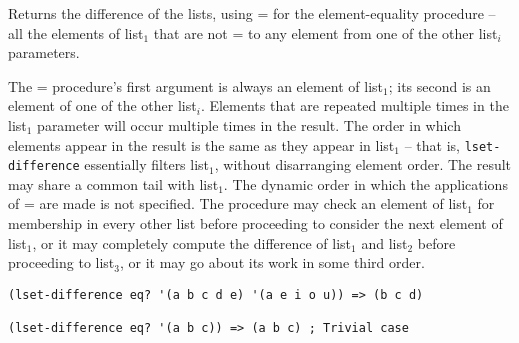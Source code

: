 \begin{entry}{%
  }

  Returns the difference of the lists, using =
  for the element-equality procedure -- all the elements of list$_1$
  that are not = to any element from one of the other list$_i$
  parameters.

  The = procedure's first argument is always an element of list$_1$;
  its second is an element of one of the other list$_i$. Elements that
  are repeated multiple times in the list$_1$ parameter will occur
  multiple times in the result.  The order in which elements appear in
  the result is the same as they appear in list$_1$ -- that is,
  \texttt{lset-difference} essentially filters list$_1$, without
  disarranging element order. The result may share a common tail with
  list$_1$.  The dynamic order in which the applications of = are made
  is not specified. The procedure may check an element of list$_1$ for
  membership in every other list before proceeding to consider the
  next element of list$_1$, or it may completely compute the
  difference of list$_1$ and list$_2$ before proceeding to list$_3$,
  or it may go about its work in some third order.

\begin{verbatim}
(lset-difference eq? '(a b c d e) '(a e i o u)) => (b c d)

(lset-difference eq? '(a b c)) => (a b c) ; Trivial case
\end{verbatim}
\end{entry}

